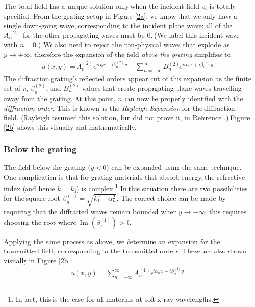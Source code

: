 The total field has a unique solution only when the incident field $u_i$ is totally specified.  From the grating setup in Figure \ref{2a}, we know that we only have a single down-going wave, corresponding to the incident plane wave; all of the $A^{(2)}_n$ for the other propagating waves must be 0.  (We label this incident wave with $n=0$.)  We also need to reject the non-physical waves that explode as $y \rightarrow +\infty$, therefore the expansion of the field \emph{above the grating} simplifies to:
\begin{align}
u(x,y) =  A^{(2)}_0 e^{i \alpha_0 x - i \beta^{(2)}_0 y} +  \sum_{n=-\infty}^{\infty} B^{(2)}_n e^{i \alpha_n x + i \beta^{(2)}_n y}
\label{rayleighExp2}
\end{align}
The diffraction grating's reflected orders appear out of this expansion as the finite set of $n$, $\beta^{(2)}_n$, and $B^{(2)}_n$ values that create propagating plane waves travelling away from the grating.  At this point, $n$ can now be properly identified with the \emph{diffraction order}.  This is known as the \emph{Rayleigh Expansion} for the diffraction field.  (Rayleigh assumed this solution, but did not prove it, in Reference \cite{Ray07}.)  Figure \ref{2b} shows this visually and mathematically. 

\subsubsection{Below the grating}
The field below the grating ($y<0$) can be expanded using the same  technique.  One complication is that for grating materials that absorb energy, the refractive index (and hence $k=k_1$) is complex.\footnote{In fact, this is the case for all materials at soft x-ray wavelengths.}  In this situation there are two possibilities for the square root $\beta^{(1)}_n = \sqrt{k_1^2-\alpha_n^2}$.  The correct choice can be made by requiring that the diffracted waves remain bounded when $y\rightarrow -\infty$; this requires choosing the root where $\operatorname{Im}(\beta^{(1)}_n) > 0$.

Applying the same process as above, we determine an expansion for the transmitted field, corresponding to the transmitted orders.  These are also shown visually in Figure \ref{2b}:
\begin{align}
u(x,y) =  \sum_{n=-\infty}^{\infty} A^{(1)}_{n} e^{i \alpha_n x - i \beta^{(1)}_{n} y}
\label{rayleighExp1}
\end{align}

